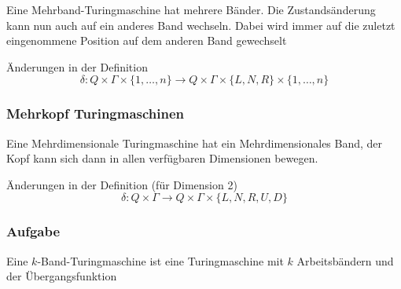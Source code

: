 \documentclass{beamer}
\begin{document}
{\begin{frame}
\begin{figure}[H]
\begin{center}
\end{center}
\end{figure}
Eine Mehrband-Turingmaschine hat mehrere Bänder. Die Zustandsänderung kann nun auch auf ein anderes Band wechseln. Dabei wird immer auf die zuletzt eingenommene Position auf dem anderen Band gewechselt 
\begin{block}{Änderungen in der Definition}
$$ \delta: Q \times \Gamma \times \{1, \ldots, n\} \rightarrow Q \times \Gamma \times \{L,N,R\} \times \{1, \ldots, n\}$$
\end{block}
\end{frame}
\begin{frame}
\frametitle{Mehrkopf Turingmaschinen}
\vspace{-2cm}
\begin{figure}[H]
\begin{center}
\end{center}
\end{figure}
Eine Mehrdimensionale Turingmaschine hat ein Mehrdimensionales Band, der Kopf kann sich dann in allen verfügbaren Dimensionen bewegen.
\begin{block}{Änderungen in der Definition (für Dimension 2)}
$$ \delta: Q \times \Gamma \rightarrow Q \times \Gamma \times \{L,N,R,U,D\}$$
\end{block}
\end{frame}

\begin{frame}
\frametitle{Aufgabe}
\vspace{-1cm}
Eine $k$-Band-Turingmaschine ist eine Turingmaschine mit $k$
Arbeitsbändern und der Übergangsfunktion


\end{frame}}
\end{document}
